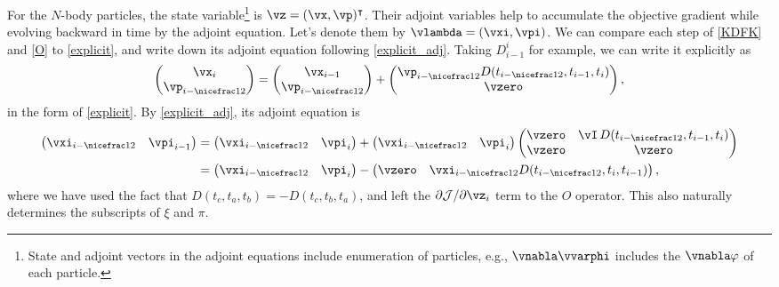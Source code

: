 \documentclass[modern, trackchanges, dvipsnames]{aastex631}
\newcommand{\p}{\partial}
\newcommand{\cJ}{\mathcal{J}}
\newcommand{\half}{\nicefrac12}
\begin{document}
For the $N$-body particles, the state variable\footnote{State and
adjoint vectors in the adjoint equations include enumeration of
particles, e.g., $\vnabla\vvarphi$ includes the $\vnabla\varphi$ of each
particle.} is $\vz = (\vx, \vp)^\intercal$.
Their adjoint variables help to accumulate the objective gradient while
evolving backward in time by the adjoint equation.
Let's denote them by $\vlambda = (\vxi, \vpi)$.
We can compare each step of \eqref{KDFK} and \eqref{O} to
\eqref{explicit}, and write down its adjoint equation following
\eqref{explicit_adj}.
Taking $D_{i-1}^i$ for example, we can write it explicitly as
%
\begin{equation*}
\begin{pmatrix} \vx_i \\ \vp_{i-\half} \end{pmatrix}
= \begin{pmatrix} \vx_{i-1} \\ \vp_{i-\half} \end{pmatrix}
+ \begin{pmatrix}
    \vp_{i-\half} D(t_{i-\half}, t_{i-1}, t_i) \\ \vzero
  \end{pmatrix},
\end{equation*}
%
in the form of \eqref{explicit}.
By \eqref{explicit_adj}, its adjoint equation is
%
\begin{align*}
\begin{pmatrix} \vxi_{i-\half} & \vpi_{i-1} \end{pmatrix}
&= \begin{pmatrix} \vxi_{i-\half} & \vpi_i \end{pmatrix}
+ \begin{pmatrix} \vxi_{i-\half} & \vpi_i \end{pmatrix}
  \begin{pmatrix}
    \vzero & \vI \, D(t_{i-\half}, t_{i-1}, t_i) \\
    \vzero & \vzero \\
  \end{pmatrix} \\
%
&= \begin{pmatrix} \vxi_{i-\half} & \vpi_i \end{pmatrix}
- \begin{pmatrix}
    \vzero & \vxi_{i-\half} D(t_{i-\half}, t_i, t_{i-1})
  \end{pmatrix},
\end{align*}
%
where we have used the fact that $D(t_c, t_a, t_b) = - D(t_c, t_b,
t_a)$, and left the $\p\cJ / \p\vz_i$ term to the $O$ operator.
This also naturally determines the subscripts of $\xi$ and $\pi$.
\end{document}
